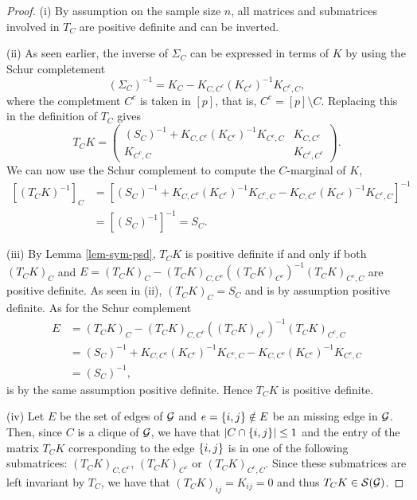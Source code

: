 \begin{proof}
    (i) By assumption on the sample size $n$, all matrices and submatrices involved in $T_C$ are positive definite and can be inverted.

    (ii) As seen earlier, the inverse of $\Sigma_C$ can be expressed in terms of $K$ by using the Schur completement
    \begin{equation*}
        (\Sigma_C)^{-1} = K_C - K_{C, C^c}(K_{C^c})^{-1}K_{C^c, C},
    \end{equation*}
    where the completment $C^c$ is taken in $[p]$, that is, $C^c = [p] \setminus C$. Replacing this in the definition of $T_C$ gives
    \begin{equation} \label{eq-tc-2}
        T_C K = \begin{pmatrix}
            (S_C)^{-1} + K_{C, C^c}(K_{C^c})^{-1}K_{C^c, C} & K_{C, C^c}\\
            K_{C^c, C} & K_{C^c, C^c}
            \end{pmatrix}.
    \end{equation}
    We can now use the Schur complement to compute the $C$-marginal of $K$,
    \begin{align*}
        \left[(T_C K)^{-1}\right]_C 
        &= \left[ (S_C)^{-1} + K_{C, C^c}(K_{C^c})^{-1}K_{C^c, C} - K_{C, C^c}(K_{C^c})^{-1}K_{C^c, C} \right]^{-1}\\
        &= \left[ (S_C)^{-1}\right]^{-1} = S_C.
    \end{align*}

    (iii) By Lemma \ref{lem-sym-psd}, $T_C K$ is positive definite if and only if both $(T_C K)_C$ and $E = (T_C K)_C - (T_C K)_{C, C^c}((T_C K)_{C^c})^{-1}(T_C K)_{C^c,C}$ are positive definite. As seen in (ii), $(T_C K)_C = S_C$ and is by assumption positive definite. As for the Schur complement
    \begin{align*}
        E &= (T_C K)_C - (T_C K)_{C, C^c}((T_C K)_{C^c})^{-1}(T_C K)_{C^c,C}\\
        &= (S_C)^{-1} + K_{C, C^c}(K_{C^c})^{-1}K_{C^c, C} - K_{C, C^c}(K_{C^c})^{-1}K_{C^c,C}\\
        &= (S_C)^{-1},
    \end{align*}
    is by the same assumption positive definite. Hence $T_C K$ is positive definite.

    (iv) Let $E$ be the set of edges of ${\mathcal{G}}$ and $e = {\left\{i, j\right\}} \notin E$ be an missing edge in ${\mathcal{G}}$. Then, since $C$ is a clique of ${\mathcal{G}}$, we have that $|C \cap {\left\{i, j\right\}}| \leq 1$ and the entry of the matrix $T_C K$ corresponding to the edge ${\left\{i, j\right\}}$ is in one of the following submatrices: $(T_C K)_{C, C^c}$, $(T_C K)_{C^c}$ or $(T_C K)_{C^c,C}$. Since these submatrices are left invariant by $T_C$, we have that $(T_C K)_{ij} = K_{ij} = 0$ and thus $T_C K \in {\mathcal{S}}({\mathcal{G}})$.
\end{proof}

